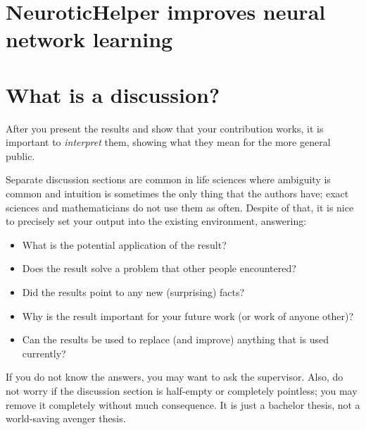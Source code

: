 \section{NeuroticHelper improves neural network learning}

\section{What is a discussion?}
After you present the results and show that your contribution works, it is important to \emph{interpret} them, showing what they mean for the more general public.

Separate discussion sections are common in life sciences where ambiguity is common and intuition is sometimes the only thing that the authors have; exact sciences and mathematicians do not use them as often. Despite of that, it is nice to precisely set your output into the existing environment, answering:
\begin{itemize}
\item What is the potential application of the result?
\item Does the result solve a problem that other people encountered?
\item Did the results point to any new (surprising) facts?
\item Why is the result important for your future work (or work of anyone other)?
\item Can the results be used to replace (and improve) anything that is used currently?
\end{itemize}

If you do not know the answers, you may want to ask the supervisor. Also, do not worry if the discussion section is half-empty or completely pointless; you may remove it completely without much consequence. It is just a bachelor thesis, not a world-saving avenger thesis.
\fi
